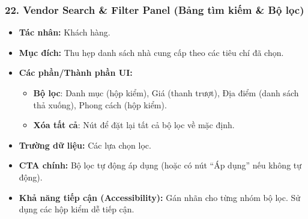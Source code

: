 \documentclass[11pt,a4paper]{article}
\begin{document}
\subsubsection{22. Vendor Search \& Filter Panel (Bảng tìm kiếm \& Bộ lọc)}
\begin{itemize}
    \item \textbf{Tác nhân:} Khách hàng.
    \item \textbf{Mục đích:} Thu hẹp danh sách nhà cung cấp theo các tiêu chí đã chọn.
    \item \textbf{Các phần/Thành phần UI:}
    \begin{itemize}
        \item \textbf{Bộ lọc}: Danh mục (hộp kiểm), Giá (thanh trượt), Địa điểm (danh sách thả xuống), Phong cách (hộp kiểm).
        \item \textbf{Xóa tất cả}: Nút để đặt lại tất cả bộ lọc về mặc định.
    \end{itemize}
    \item \textbf{Trường dữ liệu:} Các lựa chọn lọc.
    \item \textbf{CTA chính:} Bộ lọc tự động áp dụng (hoặc có nút ``Áp dụng'' nếu không tự động).
    \item \textbf{Khả năng tiếp cận (Accessibility):} Gán nhãn cho từng nhóm bộ lọc. Sử dụng các hộp kiểm dễ tiếp cận.
\end{itemize}
\end{document}
